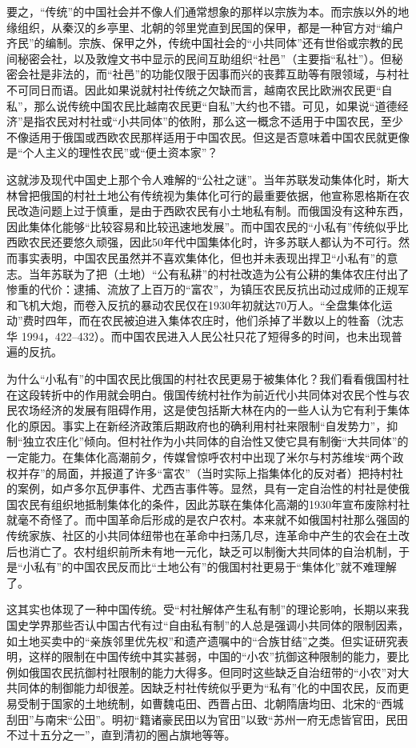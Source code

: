 \documentclass[a4paper,12pt,punct=kaiming]{ctexart}
\begin{document}
要之，“传统”的中国社会并不像人们通常想象的那样以宗族为本。而宗族以外的地缘组织，从秦汉的乡亭里、北朝的邻里党直到民国的保甲，都是一种官方对“编户齐民”的编制。宗族、保甲之外，传统中国社会的“小共同体”还有世俗或宗教的民间秘密会社，以及敦煌文书中显示的民间互助组织“社邑”（主要指“私社”）。但秘密会社是非法的，而“社邑”的功能仅限于因事而兴的丧葬互助等有限领域，与村社不可同日而语。因此如果说就村社传统之欠缺而言，越南农民比欧洲农民更“自私”，那么说传统中国农民比越南农民更“自私”大约也不错。可见，如果说“道德经济”是指农民对村社或“小共同体”的依附，那么这一概念不适用于中国农民，至少不像适用于俄国或西欧农民那样适用于中国农民。但这是否意味着中国农民就更像是“个人主义的理性农民”或“便土资本家”？

这就涉及现代中国史上那个令人难解的“公社之谜”。当年苏联发动集体化时，斯大林曾把俄国的村社土地公有传统视为集体化可行的最重要依据，他宣称恩格斯在农民改造问题上过于慎重，是由于西欧农民有小土地私有制。而俄国没有这种东西，因此集体化能够“比较容易和比较迅速地发展”。而中国农民的“小私有”传统似乎比西欧农民还要悠久顽强，因此50年代中国集体化时，许多苏联人都认为不可行。然而事实表明，中国农民虽然并不喜欢集体化，但也并未表现出捍卫“小私有”的意志。当年苏联为了把（土地）“公有私耕”的村社改造为公有公耕的集体农庄付出了惨重的代价：逮捕、流放了上百万的“富农”，为镇压农民反抗出动过成师的正规军和飞机大炮，而卷入反抗的暴动农民仅在1930年初就达70万人。“全盘集体化运动”费时四年，而在农民被迫进入集体农庄时，他们杀掉了半数以上的牲畜（沈志华 1994，422–432）。而中国农民进入人民公社只花了短得多的时间，也未出现普遍的反抗。

为什么“小私有”的中国农民比俄国的村社农民更易于被集体化？我们看看俄国村社在这段转折中的作用就会明白。俄国传统村社作为前近代小共同体对农民个性与农民农场经济的发展有阻碍作用，这是使包括斯大林在内的一些人认为它有利于集体化的原因。事实上在新经济政策后期政府也的确利用村社来限制“自发势力”，抑制“独立农庄化”倾向。但村社作为小共同体的自治性又使它具有制衡“大共同体”的一定能力。在集体化高潮前夕，传媒曾惊呼农村中出现了米尔与村苏维埃“两个政权并存”的局面，并报道了许多“富农”（当时实际上指集体化的反对者）把持村社的案例，如卢多尔瓦伊事件、尤西吉事件等。显然，具有一定自治性的村社是使俄国农民有组织地抵制集体化的条件，因此苏联在集体化高潮的1930年宣布废除村社就毫不奇怪了。而中国革命后形成的是农户农村。本来就不如俄国村社那么强固的传统家族、社区的小共同体纽带也在革命中扫荡几尽，连革命中产生的农会在土改后也消亡了。农村组织前所未有地一元化，缺乏可以制衡大共同体的自治机制，于是“小私有”的中国农民反而比“土地公有”的俄国村社更易于“集体化”就不难理解了。

这其实也体现了一种中国传统。受“村社解体产生私有制”的理论影响，长期以来我国史学界那些否认中国古代有过“自由私有制”的人总是强调小共同体的限制因素，如土地买卖中的“亲族邻里优先权”和遗产遗嘱中的“合族甘结”之类。但实证研究表明，这样的限制在中国传统中其实甚弱，中国的“小农”抗御这种限制的能力，要比例如俄国农民抗御村社限制的能力大得多。但同时这些缺乏自治纽带的“小农”对大共同体的制御能力却很差。因缺乏村社传统似乎更为“私有”化的中国农民，反而更易受制于国家的土地统制，如曹魏屯田、西晋占田、北朝隋唐均田、北宋的“西城刮田”与南宋“公田”。明初“籍诸豪民田以为官田”以致“苏州一府无虑皆官田，民田不过十五分之一”，直到清初的圈占旗地等等。
\end{document}
